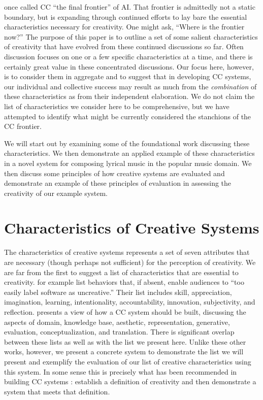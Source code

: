 \documentclass[phd,electronic,oneside,twosidetoc,letterpaper,chaptercenter,parttop,lof,lot]{byumsphd}
\begin{document}
\citeauthor{colton2012computational} \cite{colton2012computational} once called CC ``the final frontier'' of AI. That frontier is admittedly not a static boundary, but is expanding through continued efforts to lay bare the essential characteristics necessary for creativity. One might ask, ``Where is the frontier now?'' The purpose of this paper is to outline a set of some salient characteristics of creativity that have evolved from these continued discussions so far. Often discussion focuses on one or a few specific characteristics at a time, and there is certainly great value in these concentrated discussions. Our focus here, however, is to consider them in aggregate and to suggest that in developing CC systems, our individual and collective success may result as much from the \textit{combination} of these characteristics as from their independent elaboration. We do not claim the list of characteristics we consider here to be comprehensive, but we have attempted to identify what might be currently considered the stanchions of the CC frontier.

We will start out by examining some of the foundational work discussing these characteristics. We then demonstrate an applied example of these characteristics in a novel system for composing lyrical music in the popular music domain. We then discuss some principles of how creative systems are evaluated and demonstrate an example of these principles of evaluation in assessing the creativity of our example system.

\section{Characteristics of Creative Systems}

The characteristics of creative systems represents a set of seven attributes that are necessary (though perhaps not sufficient) for the perception of creativity. We are far from the first to suggest a list of characteristics that are essential to creativity. \citeauthor{colton2015stakeholder} \cite{colton2015stakeholder} for example list behaviors that, if absent, enable audiences to ``too easily label software as uncreative.'' Their list includes skill, appreciation, imagination, learning, intentionality, accountability, innovation, subjectivity, and reflection. \citeauthor{Ventura2017HowSystem} \cite{Ventura2017HowSystem} presents a view of how a CC system should be built, discussing the aspects of domain, knowledge base, aesthetic, representation, generative, evaluation, conceptualization, and translation. There is significant overlap between these lists as well as with the list we present here. Unlike these other works, however, we present a concrete system to demonstrate the list we will present and exemplify the evaluation of our list of creative characteristics using this system. In some sense this is precisely what has been recommended in building CC systems \citep{Jordanous2014}: establish a definition of creativity and then demonstrate a system that meets that definition.
\end{document}
